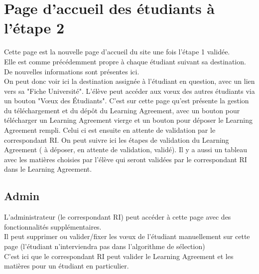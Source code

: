 \section{Page d'accueil des étudiants à l'étape 2}

Cette page est la nouvelle page d'accueil du site une fois l'étape 1 validée.\\
Elle est comme précédemment propre à chaque étudiant suivant sa destination. De nouvelles informations sont présentes ici.\\
On peut donc voir ici la destination assignée à l'étudiant en question, avec un lien vers sa "Fiche Université".
\bigbreak
L'élève peut accéder aux vœux des autres étudiants via un bouton "Vœux des Étudiants".
\bigbreak
C'est sur cette page qu'est présente la gestion du téléchargement et du dépôt du Learning Agreement, avec un bouton pour télécharger un Learning Agreement vierge et un bouton pour déposer le Learning Agreement rempli.
Celui ci est ensuite en attente de validation par le correspondant RI. On peut suivre ici les étapes de validation du Learning Agreement ( à déposer, en attente de validation, validé).
\bigbreak
Il y a aussi un tableau avec les matières choisies par l'élève qui seront validées par le correspondant RI dans le Learning Agreement.\\

\subsection{Admin}

L'administrateur (le correspondant RI) peut accéder à cette page avec des fonctionnalités supplémentaires.\\
Il peut supprimer ou valider/fixer les vœux de l'étudiant manuellement sur cette page (l'étudiant n'interviendra pas dans l'algorithme de sélection)\\
C'est ici que le correspondant RI peut valider le Learning Agreement et les matières pour un étudiant en particulier.\\